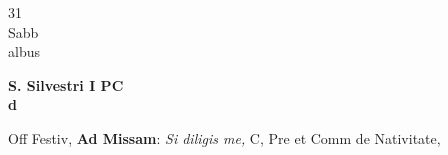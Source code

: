 \documentclass[10pt, openany]{book}
\begin{document}
        \begin{center}
            \begin{minipage}{3.5in}
                \vspace{2em}
                \begin{minipage}{0.5in}
                    {\Huge 31} \\
                    {\normalsize Sabb} \\
                    {\normalsize albus}
                \end{minipage}
                \begin{minipage}{3.0in}
                    \textbf{ \large S. Silvestri I PC \\
                    \textnormal{\normalsize d}} \\ 
                \end{minipage}
                \begin{justify}Off Festiv, \textbf{Ad Missam}: \textit{Si diligis me,} C, Pre et Comm de Nativitate,  
                \end{justify}
            \end{minipage}
        \end{center}
    
\end{document}
